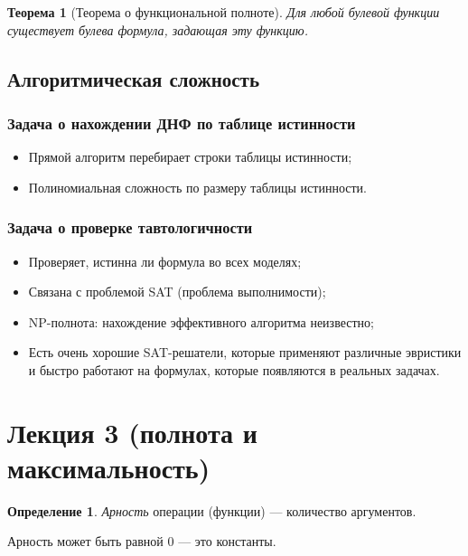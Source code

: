 \documentclass[12pt]{article}
\theoremstyle{definition}
\newtheorem{definition}{Определение}[section]
\theoremstyle{plain}
\newtheorem{theorem}{Теорема}[section]
\theoremstyle{remark}
\begin{document}
\begin{theorem}[Теорема о функциональной полноте]
  Для любой булевой функции существует булева формула, задающая эту функцию.
\end{theorem}

\subsection{Алгоритмическая сложность}
\subsubsection{Задача о нахождении ДНФ по таблице истинности}
\begin{itemize}
  \item Прямой алгоритм перебирает строки таблицы истинности;

  \item Полиномиальная сложность по размеру таблицы истинности.
\end{itemize}

\subsubsection{Задача о проверке тавтологичности}
\begin{itemize}
  \item Проверяет, истинна ли формула во всех моделях;

  \item Связана с проблемой SAT (проблема выполнимости);

  \item NP-полнота: нахождение эффективного алгоритма неизвестно;

  \item Есть очень хорошие SAT-решатели, которые применяют различные
    эвристики и быстро работают на формулах, которые появляются в
    реальных задачах.
\end{itemize}

\pagebreak

\section{Лекция 3 (полнота и максимальность)}
\begin{definition}
  \textit{Арность} операции (функции) --- количество аргументов.
\end{definition}

Арность может быть равной 0 --- это константы.
\end{document}
